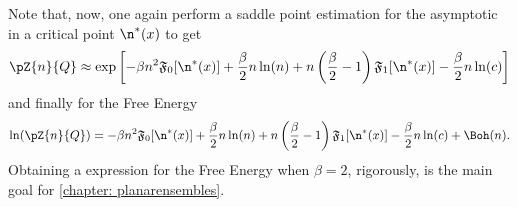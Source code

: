 Note that, now, one again perform a saddle point estimation for the asymptotic in a critical point $\n^*(x)$ to get
\begin{equation}
	\pZ{n}{Q} \approx \exp{\left[-\beta n^2 \mathfrak{F}_0[\n^*(x)] + \frac{\beta}{2} n \ln(n) + n \left(\frac{\beta}{2} - 1\right) \mathfrak{F}_1[\n^*(x)] - \frac{\beta}{2} n \ln (c) \right]}
\end{equation}
and finally for the Free Energy
\begin{equation}
	\ln(\pZ{n}{Q}) = -\beta n^2 \mathfrak{F}_0[\n^*(x)] + \frac{\beta}{2} n \ln(n) + n \left(\frac{\beta}{2} - 1\right) \mathfrak{F}_1[\n^*(x)] - \frac{\beta}{2} n \ln (c) + \Boh(n).
\end{equation}
Obtaining a expression for the Free Energy when $\beta = 2$, rigorously, is the main goal for \autoref{chapter: planarensembles}. 